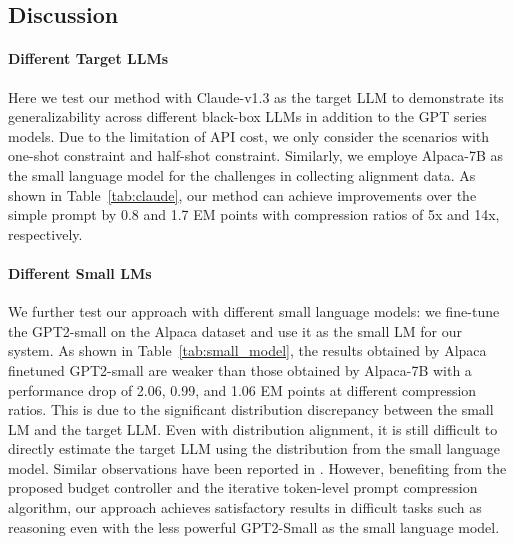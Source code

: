 \subsection{Discussion}

\paragraph{Different Target LLMs}
Here we test our method with Claude-v1.3 as the target LLM to demonstrate its generalizability across different black-box LLMs in addition to the GPT series models. %
Due to the limitation of API cost, we only consider the scenarios with %
one-shot constraint and half-shot constraint. %
Similarly, we employe Alpaca-7B as the small language model for the challenges in collecting alignment data.
As shown in Table~\ref{tab:claude}, our method can achieve improvements over the simple prompt by 0.8 and 1.7 EM points with compression ratios of 5x and 14x, respectively.


\paragraph{Different Small LMs}
We further test our approach with different small language models:
we fine-tune the GPT2-small on the Alpaca dataset and use it as the small LM for our system.
As shown in Table~\ref{tab:small_model}, the results obtained by Alpaca finetuned GPT2-small are weaker than those obtained by Alpaca-7B with a performance drop of 2.06, 0.99, and 1.06 EM points at different compression ratios.
This is due to the significant distribution discrepancy between the small LM and the target LLM.
Even with distribution alignment, it is still difficult to directly estimate the target LLM using the distribution from the small language model.
Similar observations have been reported in \citet{li2023unlocking}.
However, benefiting from the proposed budget controller and the iterative token-level prompt compression algorithm, our approach achieves satisfactory results in difficult tasks such as reasoning even with the less powerful GPT2-Small as the small language model.



